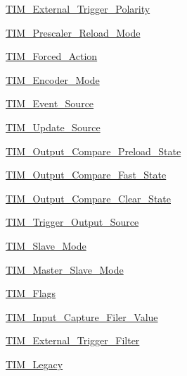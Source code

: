 \begin{DoxyCompactItemize}
\item 
\hyperlink{group___t_i_m___external___trigger___polarity}{T\+I\+M\+\_\+\+External\+\_\+\+Trigger\+\_\+\+Polarity}
\item 
\hyperlink{group___t_i_m___prescaler___reload___mode}{T\+I\+M\+\_\+\+Prescaler\+\_\+\+Reload\+\_\+\+Mode}
\item 
\hyperlink{group___t_i_m___forced___action}{T\+I\+M\+\_\+\+Forced\+\_\+\+Action}
\item 
\hyperlink{group___t_i_m___encoder___mode}{T\+I\+M\+\_\+\+Encoder\+\_\+\+Mode}
\item 
\hyperlink{group___t_i_m___event___source}{T\+I\+M\+\_\+\+Event\+\_\+\+Source}
\item 
\hyperlink{group___t_i_m___update___source}{T\+I\+M\+\_\+\+Update\+\_\+\+Source}
\item 
\hyperlink{group___t_i_m___output___compare___preload___state}{T\+I\+M\+\_\+\+Output\+\_\+\+Compare\+\_\+\+Preload\+\_\+\+State}
\item 
\hyperlink{group___t_i_m___output___compare___fast___state}{T\+I\+M\+\_\+\+Output\+\_\+\+Compare\+\_\+\+Fast\+\_\+\+State}
\item 
\hyperlink{group___t_i_m___output___compare___clear___state}{T\+I\+M\+\_\+\+Output\+\_\+\+Compare\+\_\+\+Clear\+\_\+\+State}
\item 
\hyperlink{group___t_i_m___trigger___output___source}{T\+I\+M\+\_\+\+Trigger\+\_\+\+Output\+\_\+\+Source}
\item 
\hyperlink{group___t_i_m___slave___mode}{T\+I\+M\+\_\+\+Slave\+\_\+\+Mode}
\item 
\hyperlink{group___t_i_m___master___slave___mode}{T\+I\+M\+\_\+\+Master\+\_\+\+Slave\+\_\+\+Mode}
\item 
\hyperlink{group___t_i_m___flags}{T\+I\+M\+\_\+\+Flags}
\item 
\hyperlink{group___t_i_m___input___capture___filer___value}{T\+I\+M\+\_\+\+Input\+\_\+\+Capture\+\_\+\+Filer\+\_\+\+Value}
\item 
\hyperlink{group___t_i_m___external___trigger___filter}{T\+I\+M\+\_\+\+External\+\_\+\+Trigger\+\_\+\+Filter}
\item 
\hyperlink{group___t_i_m___legacy}{T\+I\+M\+\_\+\+Legacy}
\end{DoxyCompactItemize}
